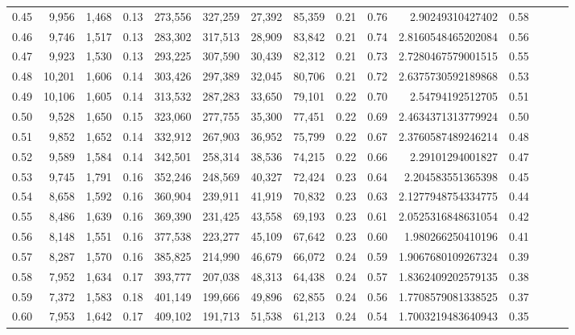 \begin{tabular}{rrrrrrrrrrrrrrr}
0.45 &   9,956 &  1,468 &  0.13 &  273,556 &  327,259 &   27,392 &   85,359 &  0.21 &  0.76 &      2.90249310427402 &      0.58 \\
0.46 &   9,746 &  1,517 &  0.13 &  283,302 &  317,513 &   28,909 &   83,842 &  0.21 &  0.74 &    2.8160548465202084 &      0.56 \\
0.47 &   9,923 &  1,530 &  0.13 &  293,225 &  307,590 &   30,439 &   82,312 &  0.21 &  0.73 &    2.7280467579001515 &      0.55 \\
0.48 &  10,201 &  1,606 &  0.14 &  303,426 &  297,389 &   32,045 &   80,706 &  0.21 &  0.72 &    2.6375730592189868 &      0.53 \\
0.49 &  10,106 &  1,605 &  0.14 &  313,532 &  287,283 &   33,650 &   79,101 &  0.22 &  0.70 &      2.54794192512705 &      0.51 \\
0.50 &   9,528 &  1,650 &  0.15 &  323,060 &  277,755 &   35,300 &   77,451 &  0.22 &  0.69 &    2.4634371313779924 &      0.50 \\
0.51 &   9,852 &  1,652 &  0.14 &  332,912 &  267,903 &   36,952 &   75,799 &  0.22 &  0.67 &    2.3760587489246214 &      0.48 \\
0.52 &   9,589 &  1,584 &  0.14 &  342,501 &  258,314 &   38,536 &   74,215 &  0.22 &  0.66 &      2.29101294001827 &      0.47 \\
0.53 &   9,745 &  1,791 &  0.16 &  352,246 &  248,569 &   40,327 &   72,424 &  0.23 &  0.64 &     2.204583551365398 &      0.45 \\
0.54 &   8,658 &  1,592 &  0.16 &  360,904 &  239,911 &   41,919 &   70,832 &  0.23 &  0.63 &    2.1277948754334775 &      0.44 \\
0.55 &   8,486 &  1,639 &  0.16 &  369,390 &  231,425 &   43,558 &   69,193 &  0.23 &  0.61 &    2.0525316848631054 &      0.42 \\
0.56 &   8,148 &  1,551 &  0.16 &  377,538 &  223,277 &   45,109 &   67,642 &  0.23 &  0.60 &     1.980266250410196 &      0.41 \\
0.57 &   8,287 &  1,570 &  0.16 &  385,825 &  214,990 &   46,679 &   66,072 &  0.24 &  0.59 &    1.9067680109267324 &      0.39 \\
0.58 &   7,952 &  1,634 &  0.17 &  393,777 &  207,038 &   48,313 &   64,438 &  0.24 &  0.57 &    1.8362409202579135 &      0.38 \\
0.59 &   7,372 &  1,583 &  0.18 &  401,149 &  199,666 &   49,896 &   62,855 &  0.24 &  0.56 &    1.7708579081338525 &      0.37 \\
0.60 &   7,953 &  1,642 &  0.17 &  409,102 &  191,713 &   51,538 &   61,213 &  0.24 &  0.54 &    1.7003219483640943 &      0.35 \\

\end{tabular}
